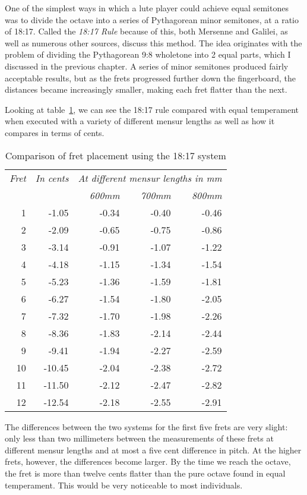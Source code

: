 One of the simplest ways in which a lute player could achieve equal semitones was to
divide the octave into a series of Pythagorean minor semitones, at a ratio of 18:17.
Called the \textit{18:17 Rule} because of this, both Mersenne and Galilei, as well as
numerous other sources, discuss this method.  The idea originates with the problem of
dividing the Pythagorean 9:8 wholetone into 2 equal parts, which I discussed in the
previous chapter.  A series of minor semitones produced fairly acceptable results, but
as the frets progressed further down the fingerboard, the distances became increasingly
smaller, making each fret flatter than the next.

Looking at table~\ref{18:17rule}, we can see the 18:17 rule compared with equal temperament
when executed with a variety of different mensur lengths as well as how it
compares in terms of cents.
\begin{table}[h!]
    \begin{center}
    \begin{tabular}{ r r| r r r }
      \textit{Fret} & \textit{In cents} & \multicolumn{3}{c}{\textit{At different mensur lengths in mm}} \\
       &  & \textit{600mm} & \textit{700mm} & \textit{800mm} \\
      \hline
      1  & -1.05  & -0.34 & -0.40 & -0.46 \\
      2  & -2.09  & -0.65 & -0.75 & -0.86 \\
      3  & -3.14  & -0.91 & -1.07 & -1.22 \\
      4  & -4.18  & -1.15 & -1.34 & -1.54 \\
      5  & -5.23  & -1.36 & -1.59 & -1.81 \\
      6  & -6.27  & -1.54 & -1.80 & -2.05 \\
      7  & -7.32  & -1.70 & -1.98 & -2.26 \\
      8  & -8.36  & -1.83 & -2.14 & -2.44 \\
      9  & -9.41  & -1.94 & -2.27 & -2.59 \\
      10 & -10.45 & -2.04 & -2.38 & -2.72 \\
      11 & -11.50 & -2.12 & -2.47 & -2.82 \\
      12 & -12.54 & -2.18 & -2.55 & -2.91 \\
    \end{tabular}
    \end{center}
    \caption{Comparison of fret placement using the 18:17 system}
    \label{18:17rule}
\end{table}
The differences between the two systems for the first five frets are very slight: only
less than two millimeters between the measurements of these frets at different mensur
lengths and at most a five cent difference in pitch.  At the higher frets, however, the
differences become larger.  By the time we reach the octave, the fret is more than
twelve cents flatter than the pure octave found in equal temperament.  This would be
very noticeable to most individuals.

